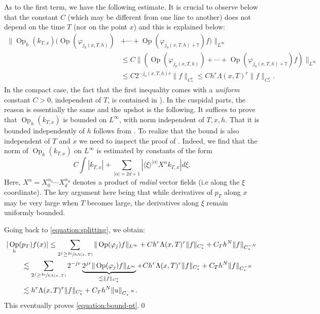\documentclass[10pt]{amsart}
\DeclareMathOperator{\Op}{Op}
\theoremstyle{plain}
\theoremstyle{definition}
\begin{document}
As to the first term, we have the following estimate. It is crucial to observe below that the constant $C$ (which may be different from one line to another) does not depend on the time $T$ (nor on the point $x$) and this is explained below:
\[
\begin{split}
\|\Op_h(k_{T,x})\bigl( \Op(\varphi_{j_0(x,T,h)}) &+ \cdots + \Op(\varphi_{j_0(x,T,h)+7}) f \bigr)\|_{L^\infty} \\
&\leq C \|\left( \Op(\varphi_{j_0(x,T,h)}) + \cdots + \Op(\varphi_{j_0(x,T,h)+7}) f \right)\|_{L^\infty} \\
&\leq C 2^{-j_0(x,T,h)r} \|f\|_{C^r_*} \leq C h^{r} \Lambda(x,T)^r \|f\|_{C^r_*}.
\end{split}
\]
In the compact case, the fact that the first inequality comes with a \emph{uniform} constant $C > 0$, independent of $T$, is contained in \cite[Proof of Lem.\,3.3]{Bonthonneau-Lefeuvre-21}). In the cuspidal parts, the reason is essentially the same and the upshot is the following. It suffices to prove that $\Op_h(k_{T,x})$ is bounded on $L^\infty$, with norm independent of $T, x, h$. That it is bounded independently of $h$ follows from \cite[Lem.\,3.2]{Bonthonneau-Lefeuvre-19-1}. To realize that the bound is also independent of $T$ and $x$ we need to inspect the proof of \cite[Lem.\,3.2]{Bonthonneau-Lefeuvre-19-1}. Indeed, we find that the norm of $\Op_h(k_{T,x})$ on $L^\infty$ is estimated by constants of the form
\[
C \int |k_{T,x}| + \sum_{|\alpha|=2d+1}|\langle\xi\rangle^{|\alpha|} X^\alpha k_{T,x}| d\xi.
\]
Here, $X^\alpha=X^{\alpha_0}_0 \cdots X^{\alpha_d}_d$ denotes a product of \emph{radial} vector fields (i.e along the $\xi$ coordinate). The key argument here being that while derivatives of $p_T$ along $x$ may be very large when $T$ becomes large, the derivatives along $\xi$ remain uniformly bounded.

Going back to \eqref{equation:splitting}, we obtain:
\[
\begin{split}
|\Op_h( &p_T )f (x)|  \leq \sum_{2^{j}\geq \sfrac{2c}{h \Lambda(x,T)}} \|\Op(\varphi_j)f\|_{L^\infty} + C h^{r} \Lambda(x,T)^r \|f\|_{C^r_*} + C_T h^N \|f\|_{C^{-N}_*} \\
&\lesssim \sum_{2^{j}\geq \sfrac{2c}{h \Lambda(x,T)}} 2^{-jr} \underbrace{2^{jr} \|\Op(\varphi_j)f\|_{L^\infty}}_{\lesssim \|f\|_{C^r_*}} + C h^{r} \Lambda(x,T)^r \|f\|_{C^r_*} + C_T h^N \|f\|_{C^{-N}_*} \\
&\lesssim h^r \Lambda(x,T)^r \|f\|_{C^r_*} + C_T h^N \|u\|_{C^{-N}_*}.
\end{split}
\]
This eventually proves \eqref{equation:bound-pt}.\qed
\end{document}
